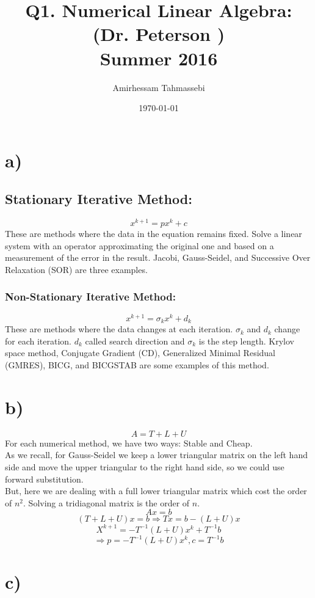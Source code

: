\documentclass[a4paper]{article}
\title{Q1. Numerical Linear Algebra: (Dr. Peterson )\\Summer 2016}
\author{Amirhessam Tahmassebi}
\date{\today}
\begin{document}
\maketitle


 

\section*{a)}


\subsection*{Stationary Iterative Method:}
$$x^{k+1} = p x^k + c$$
These are methods where the data in the equation remains fixed. Solve a linear system with an operator approximating the original one and based on a measurement of the error in the result. Jacobi, Gauss-Seidel, and Successive Over Relaxation (SOR) are three examples.
\subsubsection*{Non-Stationary Iterative Method:}
$$x^{k+1} = \sigma_k x^k + d_k$$
These are methods where the data changes at each iteration. $\sigma_k$ and $d_k$ change for each iteration. $d_k$ called search direction and $\sigma_k$ is the step length. Krylov space method, Conjugate Gradient (CD), Generalized Minimal Residual (GMRES), BICG, and BICGSTAB are some examples of this method.


\section*{b)}
$$A = T + L +U $$
For each numerical method, we have two ways: Stable and Cheap.\\
As we recall, for Gauss-Seidel we keep a lower triangular matrix on the left hand side and move the upper triangular to the right hand side, so we could use forward substitution.\\
But, here we are dealing with a full lower triangular matrix which cost the order of $n^2$. Solving a tridiagonal matrix is the order of $n$.
$$Ax = b$$
$$(T + L + U) x = b \Rightarrow Tx = b - (L+U)x$$
$$ X ^{k+1} = -T^{-1} (L+U)x^k + T^{-1} b$$
$$\Rightarrow p =-T^{-1} (L+U)x^k , c= T^{-1} b $$


\section*{c)}
\end{document}
